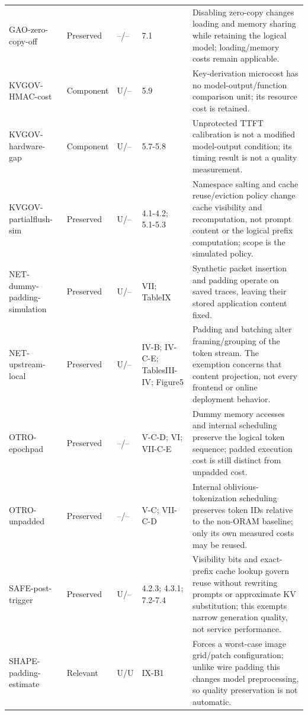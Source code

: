 \begin{longtable}{@{}p{}p{}p{}p{}p{}@{}}
GAO-\allowbreak{}zero-\allowbreak{}copy-\allowbreak{}off~\cite{gao2025iknow} & Preserved & --/-- & 7.1 & Disabling zero-copy changes loading and memory sharing while retaining the logical model; loading/memory costs remain applicable.\\
KVGOV-\allowbreak{}HMAC-\allowbreak{}cost~\cite{addagada2026kvgov} & Component & U/-- & 5.9 & Key-derivation microcost has no model-output/function comparison unit; its resource cost is retained.\\
KVGOV-\allowbreak{}hardware-\allowbreak{}gap~\cite{addagada2026kvgov} & Component & U/-- & 5.7-5.8 & Unprotected TTFT calibration is not a modified model-output condition; its timing result is not a quality measurement.\\
KVGOV-\allowbreak{}partialflush-\allowbreak{}sim~\cite{addagada2026kvgov} & Preserved & U/-- & 4.1-4.2; 5.1-5.3 & Namespace salting and cache reuse/eviction policy change cache visibility and recomputation, not prompt content or the logical prefix computation; scope is the simulated policy.\\
NET-\allowbreak{}dummy-\allowbreak{}padding-\allowbreak{}simulation~\cite{netecho2025} & Preserved & U/-- & VII; TableIX & Synthetic packet insertion and padding operate on saved traces, leaving their stored application content fixed.\\
NET-\allowbreak{}upstream-\allowbreak{}local~\cite{netecho2025} & Preserved & U/-- & IV-B; IV-C-E; TablesIII-IV; Figure5 & Padding and batching alter framing/grouping of the token stream. The exemption concerns that content projection, not every frontend or online deployment behavior.\\
OTRO-\allowbreak{}epochpad~\cite{lee2026otro} & Preserved & --/-- & V-C-D; VI; VII-C-E & Dummy memory accesses and internal scheduling preserve the logical token sequence; padded execution cost is still distinct from unpadded cost.\\
OTRO-\allowbreak{}unpadded~\cite{lee2026otro} & Preserved & --/-- & V-C; VII-C-D & Internal oblivious-tokenization scheduling preserves token IDs relative to the non-ORAM baseline; only its own measured costs may be reused.\\
SAFE-\allowbreak{}post-\allowbreak{}trigger~\cite{chu2025safekv} & Preserved & U/-- & 4.2.3; 4.3.1; 7.2-7.4 & Visibility bits and exact-prefix cache lookup govern reuse without rewriting prompts or approximate KV substitution; this exempts narrow generation quality, not service performance.\\
SHAPE-\allowbreak{}padding-\allowbreak{}estimate~\cite{hadad2026shape} & Relevant & U/U & IX-B1 & Forces a worst-case image grid/patch configuration; unlike wire padding this changes model preprocessing, so quality preservation is not automatic.\\

\end{longtable}
